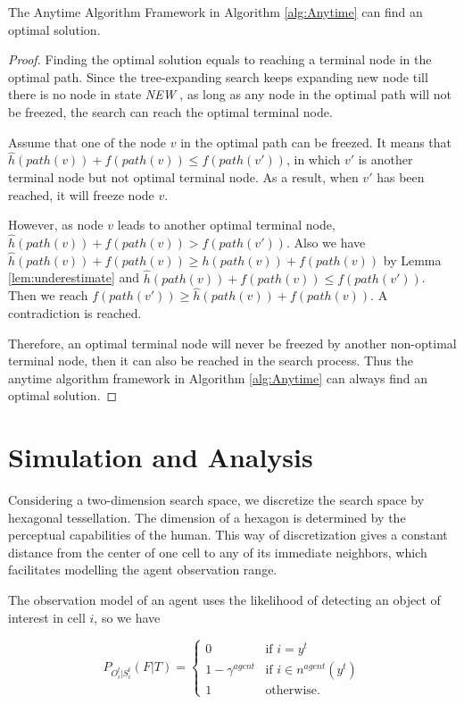 \documentclass[12pt]{article}
\begin{document}
\begin{thm} 
\label{thm:optimal}
The Anytime Algorithm Framework in Algorithm \ref{alg:Anytime} can find an optimal solution.
\begin{proof}

Finding the optimal solution equals to reaching a terminal node in the optimal path. Since the tree-expanding search keeps expanding new node till there is no node in state \emph{NEW} , as long as any node in the optimal path will not be freezed, the search can reach the optimal terminal node.

Assume that one of the node $ v $ in the optimal path can be freezed. It means that $ \hat{h}(path(v)) + f(path(v)) \leq f(path(v')) $, in which $ v' $ is another terminal node but not optimal terminal node. As a result, when $ v' $ has been reached, it will freeze node $ v $. 

However, as node $ v $ leads to another optimal terminal node, $ \hat{h}(path(v)) + f(path(v)) > f(path(v')) $. Also we have $ \hat{h}(path(v)) + f(path(v)) \geq h(path(v)) + f(path(v)) $ by Lemma \ref{lem:underestimate} and $ \hat{h}(path(v)) + f(path(v)) \leq f(path(v')) $. Then we reach $ f(path(v')) \geq \hat{h}(path(v)) + f(path(v)) $. A contradiction is reached.

Therefore, an optimal terminal node will never be freezed by another non-optimal terminal node, then it can also be reached in the search process. Thus the anytime algorithm framework in Algorithm \ref{alg:Anytime} can always find an optimal solution.

\end{proof}
\end{thm}

\section{Simulation and Analysis}

Considering a two-dimension search space, we discretize the search space by hexagonal tessellation. The dimension of a hexagon is determined by the perceptual capabilities of the human. This way of discretization gives a constant distance from the center of one cell to any of its immediate neighbors, which facilitates modelling the agent observation range.

The observation model of an agent uses the likelihood of detecting an object of interest in cell $ i $, so we have

\begin{equation}
\label{eq:agentObsMdl}
P_{O_{i}^{t}|S_{i}^{t}}(F|T)=
	\left\{
	\begin{array}{lcl}
	    0 & \mbox{if~} i=y^t \\
		1-\gamma^{agent} & \mbox{if~} i \in n^{agent}(y^t) \\
		1 & \mbox{otherwise.}
	\end{array}
	\right.
\end{equation}
\end{document}
